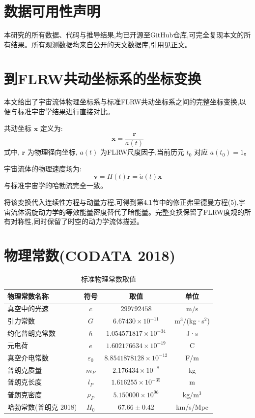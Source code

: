 \documentclass[11pt,a4paper]{article}
\begin{document}
\section{数据可用性声明}
本研究的所有数据、代码与推导结果,均已开源至GitHub仓库,可完全复现本文的所有结果。所有观测数据均来自公开的天文数据库,引用见正文。

\appendix
\section{到FLRW共动坐标系的坐标变换}
\label{app:coord}
本文给出了宇宙流体物理坐标系与标准FLRW共动坐标系之间的完整坐标变换,以便与标准宇宙学结果进行直接对比。

共动坐标 $\boldsymbol{x}$ 定义为:
\begin{equation}
\boldsymbol{x} = \frac{\boldsymbol{r}}{a(t)}
\end{equation}
式中, $\boldsymbol{r}$ 为物理径向坐标, $a(t)$ 为FLRW尺度因子,当前历元 $t_0$ 对应 $a(t_0)=1$。

宇宙流体的物理速度场为:
\begin{equation}
\boldsymbol{v} = H(t) \boldsymbol{r} = \dot{a}(t) \boldsymbol{x}
\end{equation}
与标准宇宙学的哈勃流完全一致。

将该变换代入连续性方程与动量方程,可得到第4.1节中的修正弗里德曼方程(5),宇宙流体涡旋动力学的等效能量密度替代了暗能量。完整变换保留了FLRW度规的所有对称性,同时保留了时空的动力学流体描述。

\section{物理常数(CODATA 2018)}
\label{app:const}
\begin{table}[h!]
\centering
\caption{标准物理常数取值}
\label{tab:constants}
\begin{tabular}{lccc}
\toprule
物理常数名称 & 符号 & 取值 & 单位 \\
\midrule
真空中的光速 & $c$ & $299792458$ & m/s \\
引力常数 & $G$ & $6.67430\times10^{-11}$ & m$^3$/(kg·s$^2$) \\
约化普朗克常数 & $\hbar$ & $1.054571817\times10^{-34}$ & J·s \\
元电荷 & $e$ & $1.602176634\times10^{-19}$ & C \\
真空介电常数 & $\varepsilon_0$ & $8.8541878128\times10^{-12}$ & F/m \\
普朗克质量 & $m_P$ & $2.176434\times10^{-8}$ & kg \\
普朗克长度 & $l_P$ & $1.616255\times10^{-35}$ & m \\
普朗克密度 & $\rho_P$ & $5.150000\times10^{96}$ & kg/m$^3$ \\
哈勃常数(普朗克 2018) & $H_0$ & $67.66\pm0.42$ & km/s/Mpc \\
\bottomrule
\end{tabular}
\end{table}
\end{document}
